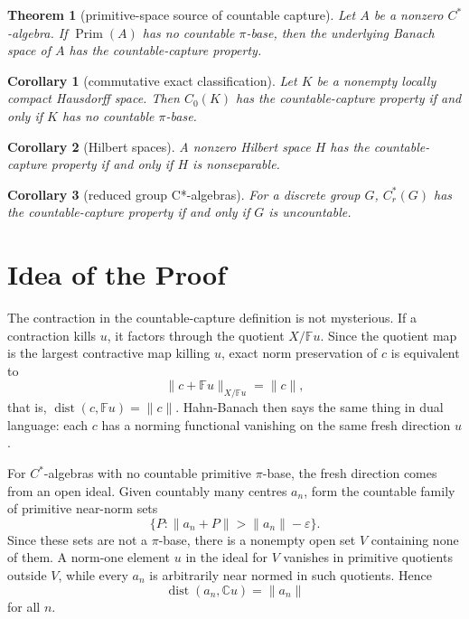 \documentclass[11pt]{article}
\newtheorem{theorem}{Theorem}
\newtheorem{corollary}{Corollary}
\newcommand{\F}{\mathbb F}
\newcommand{\C}{\mathbb C}
\newcommand{\Prim}{\operatorname{Prim}}
\newcommand{\dist}{\operatorname{dist}}
\newcommand{\Cr}{C^*_r}
\begin{document}
\begin{theorem}[primitive-space source of countable capture]
\label{thm:primitive-capture}
Let \(A\) be a nonzero \(C^*\)-algebra.  If \(\Prim(A)\) has no countable
\(\pi\)-base, then the underlying Banach space of \(A\) has the
countable-capture property.
\end{theorem}

\begin{corollary}[commutative exact classification]
\label{cor:commutative}
Let \(K\) be a nonempty locally compact Hausdorff space.  Then \(C_0(K)\) has
the countable-capture property if and only if \(K\) has no countable
\(\pi\)-base.
\end{corollary}

\begin{corollary}[Hilbert spaces]
\label{cor:hilbert}
A nonzero Hilbert space \(H\) has the countable-capture property if and only
if \(H\) is nonseparable.
\end{corollary}

\begin{corollary}[reduced group C*-algebras]
\label{cor:reduced-group}
For a discrete group \(G\), \(\Cr(G)\) has the countable-capture property if
and only if \(G\) is uncountable.
\end{corollary}

\section*{Idea of the Proof}

The contraction in the countable-capture definition is not mysterious.  If a
contraction kills \(u\), it factors through the quotient \(X/\F u\).  Since
the quotient map is the largest contractive map killing \(u\), exact norm
preservation of \(c\) is equivalent to
\[
        \|c+\F u\|_{X/\F u}=\|c\|,
\]
that is, \(\dist(c,\F u)=\|c\|\).  Hahn-Banach then says the same thing in
dual language: each \(c\) has a norming functional vanishing on the same
fresh direction \(u\).

For \(C^*\)-algebras with no countable primitive \(\pi\)-base, the fresh
direction comes from an open ideal.  Given countably many centres \(a_n\),
form the countable family of primitive near-norm sets
\[
        \{P:\|a_n+P\|>\|a_n\|-\varepsilon\}.
\]
Since these sets are not a \(\pi\)-base, there is a nonempty open set \(V\)
containing none of them.  A norm-one element \(u\) in the ideal for \(V\)
vanishes in primitive quotients outside \(V\), while every \(a_n\) is
arbitrarily near normed in such quotients.  Hence
\[
        \dist(a_n,\C u)=\|a_n\|
\]
for all \(n\).
\end{document}
